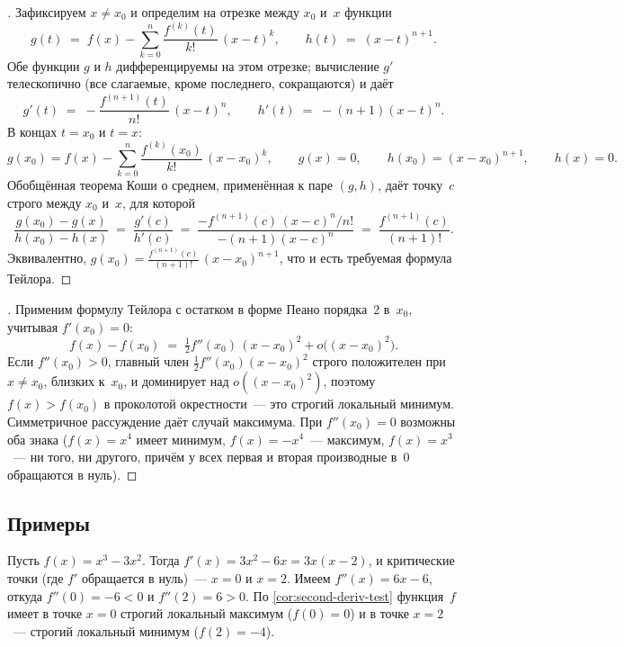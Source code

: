 \begin{proof}[]
Зафиксируем $x \neq x_0$ и определим на отрезке между $x_0$ и~$x$
функции
\[
  g(t) \;=\; f(x) - \sum_{k=0}^{n} \frac{f^{(k)}(t)}{k!}\,(x - t)^k,
  \qquad
  h(t) \;=\; (x - t)^{n+1}.
\]
Обе функции $g$ и $h$ дифференцируемы на этом отрезке; вычисление
$g'$ телескопично (все слагаемые, кроме последнего, сокращаются) и
даёт
\[
  g'(t) \;=\; -\frac{f^{(n+1)}(t)}{n!}\,(x - t)^n,
  \qquad
  h'(t) \;=\; -(n+1)(x - t)^n.
\]
В концах $t = x_0$ и $t = x$:
\[
  g(x_0) = f(x) - \sum_{k=0}^{n} \frac{f^{(k)}(x_0)}{k!}\,(x - x_0)^k,
  \qquad
  g(x) = 0,
  \qquad
  h(x_0) = (x - x_0)^{n+1},
  \qquad
  h(x) = 0.
\]
Обобщённая теорема Коши о среднем, применённая к паре $(g, h)$, даёт
точку~$c$ строго между $x_0$ и~$x$, для которой
\[
  \frac{g(x_0) - g(x)}{h(x_0) - h(x)} \;=\; \frac{g'(c)}{h'(c)}
  \;=\; \frac{-f^{(n+1)}(c)\,(x - c)^n / n!}{-(n+1)(x - c)^n}
  \;=\; \frac{f^{(n+1)}(c)}{(n+1)!}.
\]
Эквивалентно, $g(x_0) = \frac{f^{(n+1)}(c)}{(n+1)!}\,(x - x_0)^{n+1}$,
что и есть требуемая формула Тейлора.
\end{proof}

\begin{proof}[]
Применим формулу Тейлора с остатком в форме Пеано порядка~$2$
в~$x_0$, учитывая $f'(x_0) = 0$:
\[
  f(x) - f(x_0) \;=\; \tfrac{1}{2} f''(x_0)\,(x - x_0)^2 + o\bigl((x - x_0)^2\bigr).
\]
Если $f''(x_0) > 0$, главный член $\tfrac{1}{2}f''(x_0)(x - x_0)^2$
строго положителен при $x \neq x_0$, близких к~$x_0$, и доминирует
над $o((x - x_0)^2)$, поэтому $f(x) > f(x_0)$ в проколотой
окрестности~--- это строгий локальный минимум. Симметричное
рассуждение даёт случай максимума. При $f''(x_0) = 0$ возможны оба
знака ($f(x) = x^4$ имеет минимум, $f(x) = -x^4$~--- максимум,
$f(x) = x^3$~--- ни того, ни другого, причём у всех первая и вторая
производные в~$0$ обращаются в нуль).
\end{proof}

\subsection*{Примеры}

\begin{example}
\label{ex:cubic-extrema}
Пусть $f(x) = x^3 - 3x^2$. Тогда $f'(x) = 3x^2 - 6x = 3x(x - 2)$, и
критические точки (где $f'$ обращается в нуль)~--- $x = 0$ и $x = 2$.
Имеем $f''(x) = 6x - 6$, откуда $f''(0) = -6 < 0$ и $f''(2) = 6 > 0$.
По \cref{cor:second-deriv-test} функция~$f$ имеет в точке $x = 0$
строгий локальный максимум ($f(0) = 0$) и в точке $x = 2$~--- строгий
локальный минимум ($f(2) = -4$).
\end{example}

